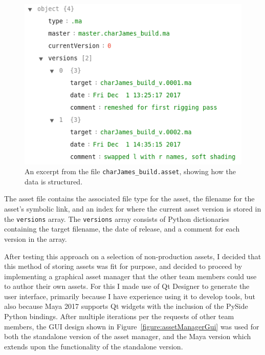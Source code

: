 \documentclass[11pt]{article}
\begin{document}
\begin{figure}[htbp]\centering
	\includegraphics[width=0.8\linewidth]{images/assetExample.png}
	\caption{\label{figure:exampleAsset} An excerpt from the file \texttt{charJames\_build.asset}, showing how the data is structured.}
\end{figure}

The asset file contains the associated file type for the asset, the filename for the asset's symbolic link, and an index for where the current asset version is stored in the \texttt{versions} array. The \texttt{versions} array consists of Python dictionaries containing the target filename, the date of release, and a comment for each version in the array.

After testing this approach on a selection of non-production assets, I decided that this method of storing assets was fit for purpose, and decided to proceed by implementing a graphical asset manager that the other team members could use to author their own assets. For this I made use of Qt Designer to generate the user interface, primarily because I have experience using it to develop tools, but also because Maya 2017 supports Qt widgets with the inclusion of the PySide Python bindings. After multiple iterations per the requests of other team members, the GUI design shown in Figure~\ref{figure:assetManagerGui} was used for both the standalone version of the asset manager, and the Maya version which extends upon the functionality of the standalone version.
\end{document}
